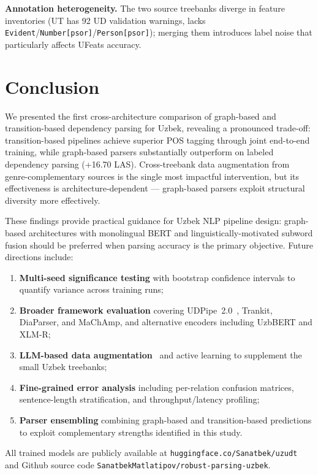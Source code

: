 \documentclass[10pt,conference,a4paper]{IEEEtran_EDM}
\begin{document}
\textbf{Annotation heterogeneity.} The two source treebanks diverge in feature inventories (UT has 92 UD validation warnings, lacks \texttt{Evident}/\texttt{Number[psor]}/\texttt{Person[psor]}); merging them introduces label noise that particularly affects UFeats accuracy.

\section{Conclusion}

We presented the first cross-architecture comparison of graph-based and transition-based dependency parsing for Uzbek, revealing a pronounced trade-off: transition-based pipelines achieve superior POS tagging through joint end-to-end training, while graph-based parsers substantially outperform on labeled dependency parsing (+16.70 LAS). Cross-treebank data augmentation from genre-complementary sources is the single most impactful intervention, but its effectiveness is architecture-dependent --- graph-based parsers exploit structural diversity more effectively.

These findings provide practical guidance for Uzbek NLP pipeline design: graph-based architectures with monolingual BERT and linguistically-motivated subword fusion should be preferred when parsing accuracy is the primary objective. Future directions include:
\begin{enumerate}[label=(\roman*)]
  \item \textbf{Multi-seed significance testing} with bootstrap confidence intervals to quantify variance across training runs;
  \item \textbf{Broader framework evaluation} covering UDPipe~2.0~\cite{straka2018udpipe}, Trankit, DiaParser, and MaChAmp, and alternative encoders including UzbBERT and XLM-R;
  \item \textbf{LLM-based data augmentation}~\cite{whitehouse2024llm} and active learning to supplement the small Uzbek treebanks;
  \item \textbf{Fine-grained error analysis} including per-relation confusion matrices, sentence-length stratification, and throughput/latency profiling;
  \item \textbf{Parser ensembling} combining graph-based and transition-based predictions to exploit complementary strengths identified in this study.
\end{enumerate}

All trained models are publicly available at \texttt{huggingface.co/Sanatbek/uzudt} and Github source code \texttt{SanatbekMatlatipov/robust-parsing-uzbek}.
\end{document}
